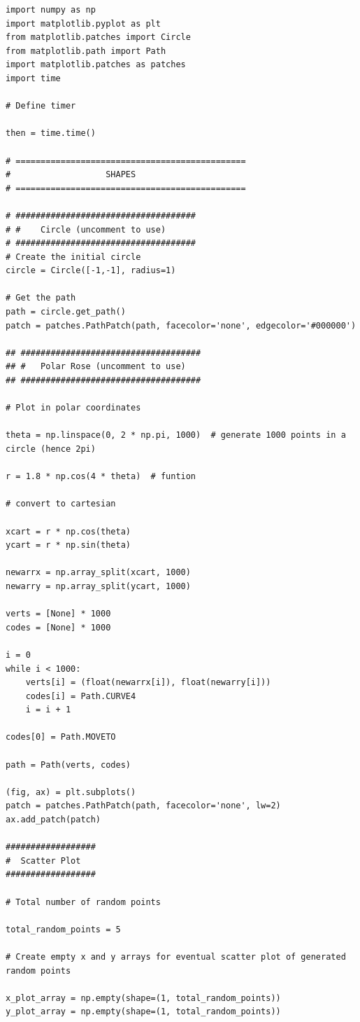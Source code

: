 \documentclass[11pt]{article}
\begin{document}
\begin{singlespace}
\begin{lstlisting}
import numpy as np
import matplotlib.pyplot as plt
from matplotlib.patches import Circle
from matplotlib.path import Path
import matplotlib.patches as patches
import time

# Define timer

then = time.time()

# ==============================================
#                   SHAPES
# ==============================================

# ####################################
# #    Circle (uncomment to use)
# ####################################
# Create the initial circle
circle = Circle([-1,-1], radius=1)

# Get the path
path = circle.get_path()
patch = patches.PathPatch(path, facecolor='none', edgecolor='#000000')

## ####################################
## #   Polar Rose (uncomment to use)
## ####################################

# Plot in polar coordinates

theta = np.linspace(0, 2 * np.pi, 1000)  # generate 1000 points in a circle (hence 2pi)

r = 1.8 * np.cos(4 * theta)  # funtion

# convert to cartesian

xcart = r * np.cos(theta)
ycart = r * np.sin(theta)

newarrx = np.array_split(xcart, 1000)
newarry = np.array_split(ycart, 1000)

verts = [None] * 1000
codes = [None] * 1000

i = 0
while i < 1000:
    verts[i] = (float(newarrx[i]), float(newarry[i]))
    codes[i] = Path.CURVE4
    i = i + 1

codes[0] = Path.MOVETO

path = Path(verts, codes)

(fig, ax) = plt.subplots()
patch = patches.PathPatch(path, facecolor='none', lw=2)
ax.add_patch(patch)

##################
#  Scatter Plot
##################

# Total number of random points

total_random_points = 5

# Create empty x and y arrays for eventual scatter plot of generated random points

x_plot_array = np.empty(shape=(1, total_random_points))
y_plot_array = np.empty(shape=(1, total_random_points))


\end{lstlisting}
\end{singlespace}
\end{document}

